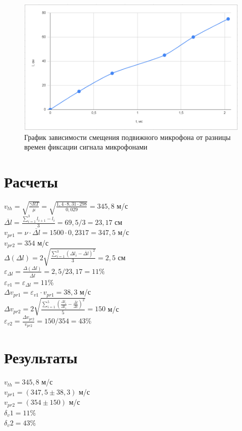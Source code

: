 \documentclass[12pt]{article}
\begin{document}
	\begin{figure}[H]
		\centering
		\includegraphics[scale=0.7]{graph3}
		\caption{График зависимости смещения подвижного микрофона от разницы времен фиксации сигнала микрофонами}
	\end{figure}
	\section{Расчеты}
	$\displaystyle v_{th}=\sqrt{\frac{\gamma RT}{\mu}}=\sqrt{\frac{1{,}4\cdot8{,}31\cdot298}{0{,}029}}=345{,}8$ м/с\\
	$\displaystyle\overline{\Delta l}=\frac{\sum\limits_{i=1}^{3}l_{i+1} - l_i}{3}=69{,}5/3=23{,}17$ см\\
	$\displaystyle v_{pr1}=\nu\cdot\overline{\Delta l}=1500\cdot0{,}2317=347{,}5$ м/с\\
	$v_{pr2}=354$ м/с\\
	$\displaystyle\Delta(\Delta l)=2\sqrt{\frac{\sum \limits_{i=1}^{3} (\Delta l_i-\overline{\Delta l})^2}{3}}=2{,}5$ см\\
	$\displaystyle\varepsilon_{\Delta l}=\frac{\Delta(\Delta l)}{\overline{\Delta l}}=2{,}5/23{,}17=11\%$\\
	$\displaystyle\varepsilon_{v1}=\varepsilon_{\Delta l}=11\%$\\
	$\displaystyle\Delta v_{pr1}=\varepsilon_{v1}\cdot v_{pr1}=38{,}3$ м/с\\
	$\displaystyle\Delta v_{pr2}=2\sqrt{\frac{\sum \limits_{i=1}^{5} (\frac{\Delta l_i}{\Delta t_i}-\overline{\frac{\Delta l}{\Delta t}})^2}{5}}=150$ м/с\\
	$\varepsilon_{v2}=\frac{\Delta v_{pr2}}{v_{pr2}}=150/354=43\%$
	\section{Результаты}
	$\displaystyle v_{th}=345{,}8$ м/с\\
	$\displaystyle v_{pr1}=(347{,}5\pm38{,}3)$ м/с\\
	$v_{pr2}=(354\pm150)$ м/с\\
	$\delta_v1=11\%$\\
	$\delta_v2=43\%$\\
\end{document}
